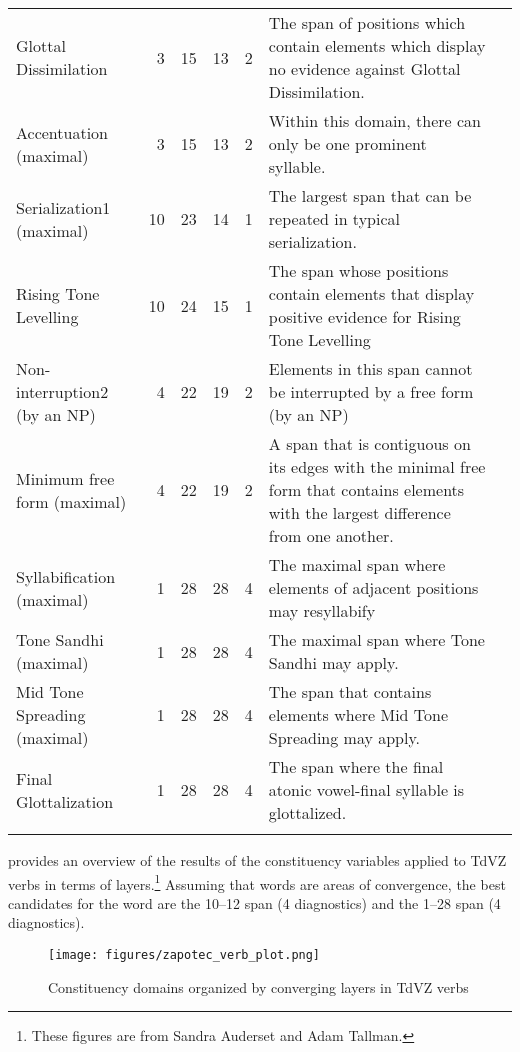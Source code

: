 \documentclass[output=paper]{langscibook}
\begin{document}
\begin{longtable}{p{2cm}rrrrp{5.5cm}@{}c@{}}
\raggedright Glottal Dissimilation & 3 & 15 & 13 & 2             & \raggedright The span of positions which contain elements which display no evidence against Glottal Dissimilation. &\\
\raggedright Accentuation (maximal) & 3 & 15 & 13 & 2            & \raggedright Within this domain, there can only be one prominent syllable. &\\
\raggedright Serialization1 (maximal) & 10 & 23 & 14 & 1         & \raggedright The largest span that can be repeated in typical serialization. &\\
\raggedright Rising Tone Levelling & 10 & 24 & 15 & 1            & \raggedright The span whose positions contain elements that display positive evidence for Rising Tone Levelling&\\
\raggedright Non-interruption2 (by an NP) & 4 & 22 & 19 & 2      & \raggedright Elements in this span cannot be interrupted by a free form (by an NP)&\\
\raggedright Minimum free form (maximal) & 4 & 22 & 19 & 2       & \raggedright A span that is contiguous on its edges with the minimal free form that contains elements with the largest difference from one another.&\\
\raggedright Syllabification (maximal) & 1 & 28 & 28 & 4         & \raggedright The maximal span where elements of adjacent positions may resyllabify&\\
\raggedright Tone Sandhi (maximal) & 1 & 28 & 28 & 4             & \raggedright The maximal span where Tone Sandhi may apply.&\\
\raggedright Mid Tone Spreading (maximal) & 1 & 28 & 28 & 4      & \raggedright The span that contains elements where Mid Tone Spreading may apply.&\\
\raggedright Final Glottalization & 1 & 28 & 28 & 4              & \raggedright The span where the final atonic vowel-final syllable is glottalized.  &\\
\lspbottomrule
\label{tab:key:zap:3}
\end{longtable}


 provides an overview of the results of the constituency variables applied to TdVZ verbs in terms of layers.\footnote{These figures are from Sandra Auderset and Adam Tallman.}  Assuming that words are areas of convergence, the best candidates for the word are the 10–12 span (4 diagnostics) and the 1–28 span (4 diagnostics). 

\begin{figure}
    \texttt{[image: figures/zapotec\_verb\_plot.png]}
    \caption{Constituency domains organized by converging layers in TdVZ verbs}
    \label{fig:key:zap:1}
\end{figure}
\end{document}
